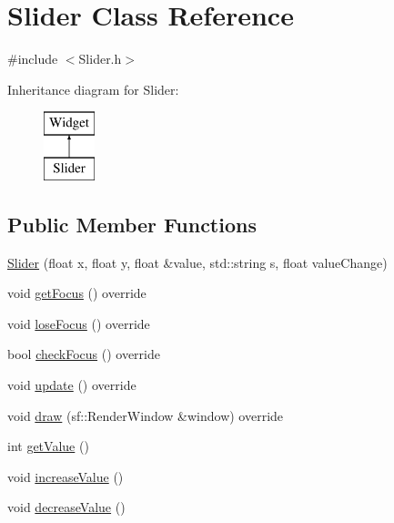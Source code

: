 \hypertarget{class_slider}{}\section{Slider Class Reference}
\label{class_slider}


{\ttfamily \#include $<$Slider.\+h$>$}

Inheritance diagram for Slider\+:\begin{figure}[H]
\begin{center}
\leavevmode
\includegraphics[height=2.000000cm]{class_slider}
\end{center}
\end{figure}
\subsection*{Public Member Functions}
\begin{DoxyCompactItemize}
\item 
\mbox{\hyperlink{class_slider_a5c41dd3b21735a54ae5d94090bcdcae4}{Slider}} (float x, float y, float \&value, std\+::string s, float value\+Change)
\item 
void \mbox{\hyperlink{class_slider_aacedd16fdfd8b44067e0c8fd5b908b69}{get\+Focus}} () override
\item 
void \mbox{\hyperlink{class_slider_aae708de41200e777a10c9cc6d9834ce5}{lose\+Focus}} () override
\item 
bool \mbox{\hyperlink{class_slider_ab81e90562123cacd8f624b326b9b3f3e}{check\+Focus}} () override
\item 
void \mbox{\hyperlink{class_slider_a4ebd527db54ea263c7d0efe4d1f94e1b}{update}} () override
\item 
void \mbox{\hyperlink{class_slider_a8d2355aa14e267385d7d0f79300ffc6b}{draw}} (sf\+::\+Render\+Window \&window) override
\item 
int \mbox{\hyperlink{class_slider_a9e72ef47f0b78846d776aa75caa4113d}{get\+Value}} ()
\item 
void \mbox{\hyperlink{class_slider_a43bb29d29c19b4f0838462a18896660c}{increase\+Value}} ()
\item 
void \mbox{\hyperlink{class_slider_ae8bf6bef11bae69bc6a01276b6ad7ddd}{decrease\+Value}} ()
\end{DoxyCompactItemize}
